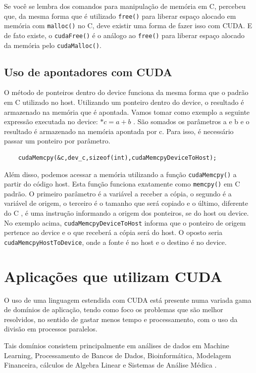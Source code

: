 \documentclass[12pt]{article}
\begin{document}
Se você se lembra dos comandos para manipulação de memória em C, percebeu que, da mesma forma que é utilizado \verb|free()| para liberar espaço alocado em memória com \verb|malloc()| no C, deve existir uma forma de fazer isso com CUDA. E de fato existe, o \verb|cudaFree()| é o análogo ao \verb|free()| para liberar espaço alocado da memória pelo \verb|cudaMalloc()|.

\subsection{Uso de apontadores com CUDA}
O método de ponteiros dentro do device funciona da mesma forma que o padrão em C utilizado no host. Utilizando um ponteiro dentro do device, o resultado é armazenado na memória que é apontada. Vamos tomar como exemplo a seguinte expressão executada no device: $*c = a + b$ . São somados os parâmetros a e b e o resultado é armazenado na memória apontada por c. Para isso, é necessário passar um ponteiro por parâmetro.

\begin{verbatim}
    cudaMemcpy(&c,dev_c,sizeof(int),cudaMemcpyDeviceToHost);
\end{verbatim}

Além disso, podemos acessar a memória utilizando a função \verb|cudaMemcpy()| a partir do código host. Esta função funciona exatamente como \verb|memcpy()| em C padrão. O primeiro parâmetro é a variável a receber a cópia, o segundo é a variável de origem, o terceiro é o tamanho que será copiado e o último, diferente do C , é uma instrução informando a origem dos ponteiros, se do host ou device. No exemplo acima, \verb|cudaMemcpyDeviceToHost| informa que o ponteiro de origem pertence ao device e o que receberá a cópia será do host. O oposto seria \verb|cudaMemcpyHostToDevice|, onde a fonte é no host e o destino é no device.

\section{Aplicações que utilizam CUDA} \label{sec:figs}
O uso de uma linguagem estendida com CUDA está presente numa variada gama de domínios de aplicação, tendo como foco os problemas que são melhor resolvidos, no sentido de gastar menos tempo e processamento, com o uso da divisão em processos paralelos.

Tais domínios consistem principalmente em análises de dados em Machine Learning, Processamento de Bancos de Dados, Bioinformática, Modelagem Financeira, cálculos de Algebra Linear e Sistemas de Análise Médica \cite{CUDAartigo1}.
\end{document}

